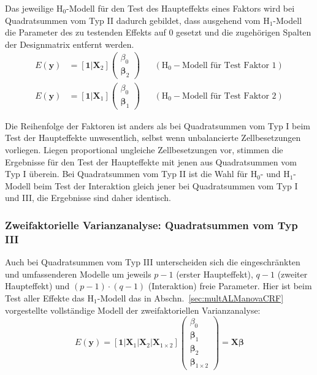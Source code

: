 Das jeweilige $\text{H}_{0}$-Modell für den Test des Haupteffekts eines Faktors wird bei Quadratsummen vom Typ II dadurch gebildet, dass ausgehend vom $\text{H}_{1}$-Modell die Parameter des zu testenden Effekts auf $0$ gesetzt und die zugehörigen Spalten der Designmatrix entfernt werden.
\begin{align*}
E(\bm{y}) &= [\bm{1} | \bm{X}_{2}] \left(\begin{array}{l} \beta_{0} \\ \bm{\beta}_{2}\end{array}\right) && (\text{H}_{0}-\text{Modell für Test Faktor 1}) \\
E(\bm{y}) &= [\bm{1} | \bm{X}_{1}] \left(\begin{array}{l} \beta_{0} \\ \bm{\beta}_{1}\end{array}\right) && (\text{H}_{0}-\text{Modell für Test Faktor 2})
\end{align*}

Die Reihenfolge der Faktoren ist anders als bei Quadratsummen vom Typ I beim Test der Haupteffekte unwesentlich, selbst wenn unbalancierte Zellbesetzungen vorliegen. Liegen proportional ungleiche Zellbesetzungen vor, stimmen die Ergebnisse für den Test der Haupteffekte mit jenen aus Quadratsummen vom Typ I überein. Bei Quadratsummen vom Typ II ist die Wahl für $\text{H}_{0}$- und $\text{H}_{1}$-Modell beim Test der Interaktion gleich jener bei Quadratsummen vom Typ I und III, die Ergebnisse sind daher identisch.

\subsubsection{Zweifaktorielle Varianzanalyse: Quadratsummen vom Typ III}

Auch bei Quadratsummen vom Typ III unterscheiden sich die eingeschränkten und umfassenderen Modelle um jeweils $p-1$ (erster Haupteffekt), $q-1$ (zweiter Haupteffekt) und $(p-1) \cdot (q-1)$ (Interaktion) freie Parameter. Hier ist beim Test aller Effekte das $\text{H}_{1}$-Modell das in Abschn.\ \ref{sec:multALManovaCRF} vorgestellte vollständige Modell der zweifaktoriellen Varianzanalyse:
\begin{equation*}
E(\bm{y}) = [\bm{1} | \bm{X}_{1} | \bm{X}_{2} | \bm{X}_{1 \times 2}] \left(\begin{array}{l} \beta_{0} \\ \bm{\beta}_{1} \\ \bm{\beta}_{2} \\ \bm{\beta}_{1 \times 2}\end{array}\right) = \bm{X} \bm{\beta}
\end{equation*}

